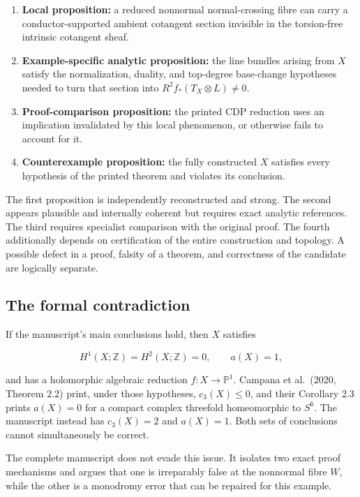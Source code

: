 \documentclass[
  10pt,
  letterpaper,
]{article}
\providecommand{\tightlist}{%
  \setlength{\itemsep}{0pt}\setlength{\parskip}{0pt}}
\newcommand{\Z}{\mathbb Z}
\newcommand{\Pone}{\mathbb P^1}
\begin{document}
\begin{enumerate}
\def\labelenumi{\arabic{enumi}.}
\tightlist
\item
  \textbf{Local proposition:} a reduced nonnormal normal-crossing fibre
  can carry a conductor-supported ambient cotangent section invisible in
  the torsion-free intrinsic cotangent sheaf.
\item
  \textbf{Example-specific analytic proposition:} the line bundles
  arising from \(X\) satisfy the normalization, duality, and top-degree
  base-change hypotheses needed to turn that section into
  \(R^2f_*(T_X\otimes L)\ne0\).
\item
  \textbf{Proof-comparison proposition:} the printed CDP reduction uses
  an implication invalidated by this local phenomenon, or otherwise
  fails to account for it.
\item
  \textbf{Counterexample proposition:} the fully constructed \(X\)
  satisfies every hypothesis of the printed theorem and violates its
  conclusion.
\end{enumerate}

The first proposition is independently reconstructed and strong. The
second appears plausible and internally coherent but requires exact
analytic references. The third requires specialist comparison with the
original proof. The fourth additionally depends on certification of the
entire construction and topology. A possible defect in a proof, falsity
of a theorem, and correctness of the candidate are logically separate.

\subsection{The formal contradiction}\label{the-formal-contradiction}

If the manuscript's main conclusions hold, then \(X\) satisfies

\[
H^1(X;\Z)=H^2(X;\Z)=0,
\qquad a(X)=1,
\]

and has a holomorphic algebraic reduction \(f:X\to\Pone\). Campana et
al.~(2020, Theorem 2.2) print, under those hypotheses, \(c_3(X)\le0\),
and their Corollary 2.3 prints \(a(X)=0\) for a compact complex
threefold homeomorphic to \(S^6\). The manuscript instead has
\(c_3(X)=2\) and \(a(X)=1\). Both sets of conclusions cannot
simultaneously be correct.

The complete manuscript does not evade this issue. It isolates two exact
proof mechanisms and argues that one is irreparably false at the
nonnormal fibre \(W\), while the other is a monodromy error that can be
repaired for this example.
\end{document}
